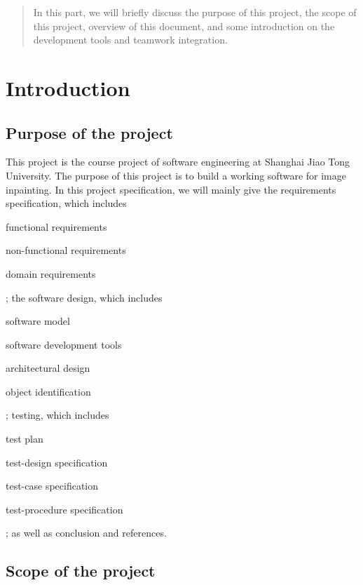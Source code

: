 \begin{abstract}
    In this part, we will briefly discuss the purpose of this project,
    the scope of this project, overview of this document, and some
    introduction on the development tools and teamwork integration.
\end{abstract}

\section{Introduction}

\subsection{Purpose of the project}
This project is the course project of software engineering at Shanghai
Jiao Tong University. The purpose of this project is to build a working
software for image inpainting. In this project specification, we will mainly
give the requirements specification, which includes 
\begin{enumerate*}
\item functional requirements
\item non-functional requirements
\item domain requirements
\end{enumerate*}; the software design, which includes 
\begin{enumerate*}
\item software model
\item software development tools
\item architectural design
\item object identification
\end{enumerate*}; testing, which includes
\begin{enumerate*}
\item test plan
\item test-design specification
\item test-case specification
\item test-procedure specification
\end{enumerate*}; as well as conclusion and references.


\subsection{Scope of the project}
